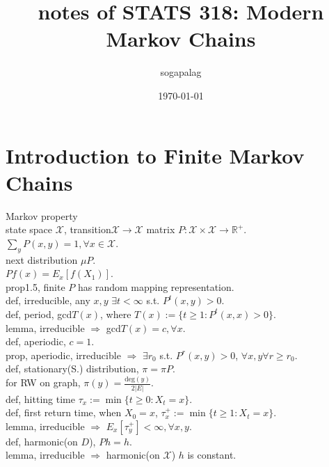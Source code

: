 \documentclass[paper=a4, fontsize=11pt]{scrartcl} %
\title{notes of STATS 318: Modern Markov Chains}
\author{sogapalag}
\date{\normalsize\today}
\numberwithin{equation}{section} %
\numberwithin{figure}{section} %
\numberwithin{table}{section} %
\begin{document}
\maketitle
\section{Introduction to Finite Markov Chains}
Markov property\\
state space $\mathcal{X}$, transition$\mathcal{X}\rightarrow \mathcal{X}$ matrix $P:\mathcal{X}\times \mathcal{X}\rightarrow \mathbb{R}^+$. $\sum_y P(x,y)=1,\forall x\in\mathcal{X}$.\\
next distribution $\mu P$.\\
$Pf(x)=E_x[f(X_1)]$.\\
prop1.5, finite $P$ has random mapping representation.\\
def, irreducible, any $x,y$ $\exists t<\infty$ s.t. $P^t(x,y)>0$.\\
def, period, gcd$T(x)$, where $T(x):=\{t\geq 1:P^t(x,x)>0\} $.\\
lemma, irreducible $\Rightarrow$ gcd$T(x)=c,\forall x$.\\
def, aperiodic, $c=1$.\\
prop, aperiodic, irreducible $\Rightarrow$ $\exists r_0$ s.t. $P^r(x,y)>0$, $\forall x,y\forall r\geq r_0$.\\
def, stationary(S.) distribution, $\pi=\pi P$.\\
for RW on graph, $\pi(y)=\frac{\text{deg}(y)}{2|E|}$.\\
def, hitting time $\tau_x:=\min\{t\geq 0:X_t=x\}$.\\
def, first return time, when $X_0=x$, $\tau_x^+:=\min\{t\geq 1:X_t=x\}$.\\
lemma, irreducible $\Rightarrow$ $E_x[\tau_y^+]<\infty,\forall x,y$.\\
def, harmonic(on $D$), $Ph=h$.\\
lemma, irreducible $\Rightarrow$ harmonic(on $\mathcal{X}$) $h$ is constant.\\
\end{document}
